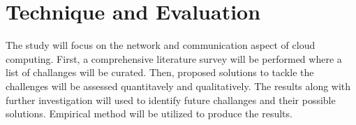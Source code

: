 
\section{Technique and Evaluation}
The study will focus on the network and communication aspect of cloud computing. First, a comprehensive literature survey will be performed where a list of challanges will be curated. Then, proposed solutions to tackle the challenges will be assessed quantitavely and qualitatively. The results along with further investigation will used to identify future challanges and their possible solutions. Empirical method will be utilized to produce the results. 



